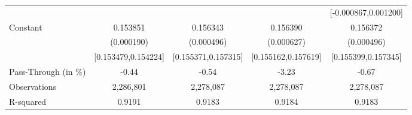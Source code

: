 {\begin{tabular}{l*{4}{c}}
                    &                     &                     &                     &[-0.000867,0.001200]         \\
Constant            &    0.153851\sym{***}&    0.156343\sym{***}&    0.156390\sym{***}&    0.156372\sym{***}\\
                    &  (0.000190)         &  (0.000496)         &  (0.000627)         &  (0.000496)         \\
                    &[0.153479,0.154224]         &[0.155371,0.157315]         &[0.155162,0.157619]         &[0.155399,0.157345]         \\
\midrule
Pass-Through (in \%)&       -0.44         &       -0.54         &       -3.23         &       -0.67         \\
Observations        &   2,286,801         &   2,278,087         &   2,278,087         &   2,278,087         \\
R-squared           &      0.9191         &      0.9183         &      0.9184         &      0.9183         \\
\bottomrule
\end{tabular}
}
